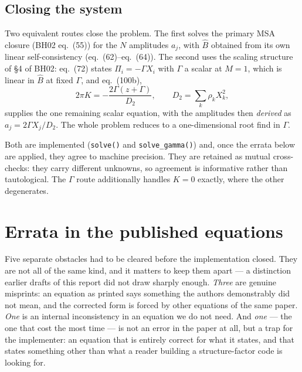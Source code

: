 \documentclass[11pt,a4paper]{article}
\newcommand{\eqBH}[1]{eq.~(#1)}
\newcommand{\code}[1]{\texttt{#1}}
\begin{document}
\subsection{Closing the system}

Two equivalent routes close the problem. The first solves the primary MSA
closure (BH02 \eqBH{55}) for the $N$ amplitudes $a_j$, with $\hat B$ obtained
from its own linear self-consistency (\eqBH{62}--\eqBH{64}). The second uses
the scaling structure of \S4 of BH02: \eqBH{72} states
$\Pi_i=-\Gamma X_i$ with $\Gamma$ a scalar at $M=1$, which is linear in
$\hat B$ at fixed $\Gamma$, and \eqBH{100b},
\begin{equation}
  2\pi K=-\frac{2\Gamma(z+\Gamma)}{D_2},\qquad D_2=\sum_k\rho_kX_k^2,
  \label{eq:gammaclosure}
\end{equation}
supplies the one remaining scalar equation, with the amplitudes then
\emph{derived} as $a_j=2\Gamma X_j/D_2$. The whole problem reduces to a
one-dimensional root find in $\Gamma$.

Both are implemented (\code{solve()} and \code{solve\_gamma()}) and, once the
errata below are applied, they agree to machine precision. They are retained as
mutual cross-checks: they carry different unknowns, so agreement is
informative rather than tautological. The $\Gamma$ route additionally handles
$K=0$ exactly, where the other degenerates.

\section{Errata in the published equations}
\label{sec:errata}

Five separate obstacles had to be cleared before the implementation closed.
They are not all of the same kind, and it matters to keep them apart --- a
distinction earlier drafts of this report did not draw sharply enough.
\emph{Three} are genuine misprints: an equation as printed says something the
authors demonstrably did not mean, and the corrected form is forced by other
equations of the same paper. \emph{One} is an internal inconsistency in an
equation we do not need. And \emph{one} --- the one that cost the most time
--- is not an error in the paper at all, but a trap for the implementer: an
equation that is entirely correct for what it states, and that states something
other than what a reader building a structure-factor code is looking for.
\end{document}
